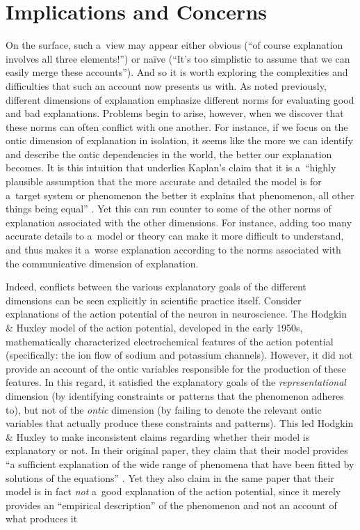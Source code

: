 \section{Implications and Concerns}
On the surface, such a~view may appear either obvious (``of course explanation involves all three elements!'') or naïve (``It's too simplistic to assume that we can easily merge these accounts''). And so it is worth exploring the complexities and difficulties that such an account now presents us with. As noted previously, different dimensions of explanation emphasize different norms for evaluating good and bad explanations. Problems begin to arise, however, when we discover that these norms can often conflict with one another. For instance, if we focus on the ontic dimension of explanation in isolation, it seems like the more we can identify and describe the ontic dependencies in the world, the better our explanation becomes. It is this intuition that underlies Kaplan's claim that it is a~``highly plausible assumption that the more accurate and detailed the model is for a~target system or phenomenon the better it explains that phenomenon, all other things being equal''
\parencite[][p.347]{kaplan_explanation_2011}. %
 Yet this can run counter to some of the other norms of explanation associated with the other dimensions. For instance, adding too many accurate details to a~model or theory can make it more difficult to understand, and thus makes it a~worse explanation according to the norms associated with the communicative dimension of explanation.

Indeed, conflicts between the various explanatory goals of the different dimensions can be seen explicitly in scientific practice itself. Consider explanations of the action potential of the neuron in neuroscience. The Hodgkin \& Huxley model of the action potential, developed in the early 1950s, mathematically characterized electrochemical features of the action potential (specifically: the ion flow of sodium and potassium channels). However, it did not provide an account of the ontic variables responsible for the production of these features. In this regard, it satisfied the explanatory goals of the \textit{representational} dimension (by identifying constraints or patterns that the phenomenon adheres to), but not of the \textit{ontic} dimension (by failing to denote the relevant ontic variables that actually produce these constraints and patterns). This led Hodgkin \& Huxley to make inconsistent claims regarding whether their model is explanatory or not. In their original paper, they claim that their model provides ``a sufficient explanation of the wide range of phenomena that have been fitted by solutions of the equations''
\parencite[][p.541]{hodgkin_quantitative_1952}. %
 Yet they also claim in the same paper that their model is in fact \textit{not} a~good explanation of the action potential, since it merely provides an ``empirical description'' of the phenomenon and not an account of what produces it 


